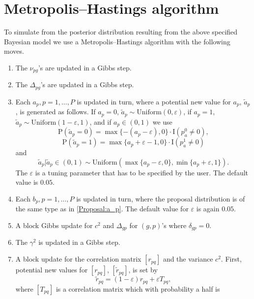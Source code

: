 \documentclass[11pt]{article}
\begin{document}
\section{\label{MH}Metropolis--Hastings algorithm}
To simulate from the posterior distribution resulting from the above specified 
Bayesian model we use a Metropolis--Hastings algorithm
with the following moves.
\begin{enumerate}
\item The $\nu_{pg}$'s are updated in a Gibbs step.
\item The $\Delta_{pg}$'s are updated in a Gibbs step.
\item \label{Proposal:a_p}Each $a_p,p=1,\ldots,P$ is updated in turn, 
where a potential new value for $a_p$, $\widetilde{a}_p$,
is generated as follows. If $a_p = 0$, $\widetilde{a}_p \sim \mbox{Uniform}(0,\varepsilon)$, if $a_p = 1$, 
$\widetilde{a}_p \sim \mbox{Uniform}(1-\varepsilon,1)$, and if $a_p\in (0,1)$ we use
\begin{equation}
\mbox{P}(\widetilde{a}_p = 0) = \max\{ -(a_p - \varepsilon),0\} \cdot \mbox{I}(p_a^0 \neq 0),
\end{equation}
\begin{equation}
\mbox{P}(\widetilde{a}_p = 1) = \max\{ a_p + \varepsilon - 1,0\} \cdot \mbox{I}(p_a^1 \neq 0)
\end{equation}
and
\begin{equation}
\widetilde{a}_p |\widetilde{a}_p\in (0,1) \sim \mbox{Uniform}(\max\{a_p-\varepsilon,0\},
\min\{a_p+\varepsilon,1\}).
\end{equation}
The $\varepsilon$ is a tuning parameter that has to be specified by the user. The default value is $0.05$.
\item Each $b_p,p=1,\ldots,P$ is updated in turn, where the proposal distribution is of the same type as in 
\ref{Proposal:a_p}. The default value for $\varepsilon$ is again $0.05$.
\item A block Gibbs update for $c^2$ and $\Delta_{gp}$ for $(g,p)$'s 
where $\delta_{gp}=0$.
\item The $\gamma^2$ is updated in a Gibbs step.
\item \label{Proposal:r}A block update for the correlation matrix 
$[r_{pq}]$ and the variance $c^2$. First, potential 
new values for $[r_{pq}]$, $[\widetilde{r}_{pq}]$,
is set by
\begin{equation}
\widetilde{r}_{pq} = (1-\varepsilon) r_{pq} + \varepsilon T_{pq},
\end{equation}
where $[T_{pq}]$ is a correlation matrix which with probability a half is 

\end{enumerate}
\end{document}
